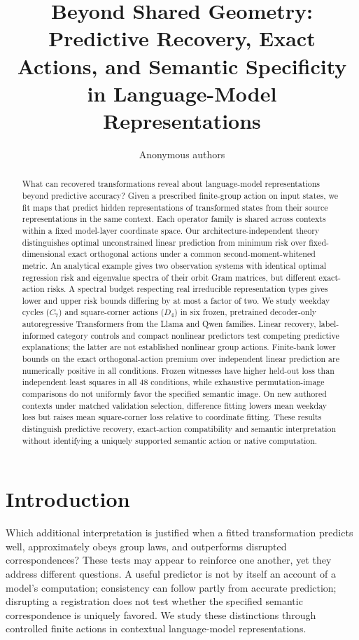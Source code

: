 \documentclass[10pt]{article}
\title{Beyond Shared Geometry: Predictive Recovery, Exact Actions, and Semantic Specificity in Language-Model Representations}
\author{Anonymous authors}
\begin{document}
\maketitle

\begin{abstract}
What can recovered transformations reveal about language-model representations beyond predictive accuracy? Given a prescribed finite-group action on input states, we fit maps that predict hidden representations of transformed states from their source representations in the same context. Each operator family is shared across contexts within a fixed model-layer coordinate space. Our architecture-independent theory distinguishes optimal unconstrained linear prediction from minimum risk over fixed-dimensional exact orthogonal actions under a common second-moment-whitened metric. An analytical example gives two observation systems with identical optimal regression risk and eigenvalue spectra of their orbit Gram matrices, but different exact-action risks. A spectral budget respecting real irreducible representation types gives lower and upper risk bounds differing by at most a factor of two. We study weekday cycles ($C_7$) and square-corner actions ($D_4$) in six frozen, pretrained decoder-only autoregressive Transformers from the Llama and Qwen families. Linear recovery, label-informed category controls and compact nonlinear predictors test competing predictive explanations; the latter are not established nonlinear group actions. Finite-bank lower bounds on the exact orthogonal-action premium over independent linear prediction are numerically positive in all \BoundedCellCount{} conditions. Frozen witnesses have higher held-out loss than independent least squares in all 48 conditions, while exhaustive permutation-image comparisons do not uniformly favor the specified semantic image. On new authored contexts under matched validation selection, difference fitting lowers mean weekday loss but raises mean square-corner loss relative to coordinate fitting. These results distinguish predictive recovery, exact-action compatibility and semantic interpretation without identifying a uniquely supported semantic action or native computation.
\end{abstract}

\section{Introduction}
Which additional interpretation is justified when a fitted transformation predicts well, approximately obeys group laws, and outperforms disrupted correspondences? These tests may appear to reinforce one another, yet they address different questions. A useful predictor is not by itself an account of a model's computation; consistency can follow partly from accurate prediction; disrupting a registration does not test whether the specified semantic correspondence is uniquely favored. We study these distinctions through controlled finite actions in contextual language-model representations.
\end{document}
